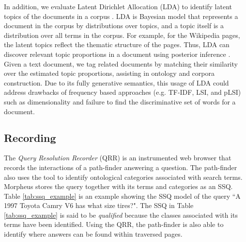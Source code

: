 In addition, we evaluate Latent Dirichlet Allocation (LDA) to identify latent topics of the documents in a corpus \cite{Blei2003latentdirichlet}.  LDA is Bayesian model that represents a document in the corpus by distributions over topics, and a topic itself is a distribution over all  terms in the corpus.  For example, for the Wikipedia pages, the latent topics reflect the thematic structure of the pages. Thus, LDA can discover relevant topic proportions in a document using posterior inference \cite{Blei2003latentdirichlet}. Given a text document, we tag related documents by matching their similarity over the estimated topic proportions, assisting in ontology and corpora construction.  Due to its fully generative semantics, this usage of LDA could address drawbacks of frequency based approaches (e.g. TF-IDF, LSI, and pLSI) such as dimensionality and failure to find the discriminative set of words for a document. %


\subsection{ Recording}
\label{sec:query_processing}


The \emph{Query Resolution Recorder} (QRR) is an instrumented web browser that records the interactions of a path-finder answering a question. The path-finder also uses the tool to identify ontological categories associated with search terms. Morpheus stores the query together with its terms and categories as an SSQ.  Table \ref{tab:ssq_example} is an example showing the SSQ model of the query ``A 1997 Toyota Camry V6 has what size tires?". The SSQ in Table \ref{tab:ssq_example} is said to be \emph{qualified} because the classes associated with its terms have been identified. Using the QRR, the path-finder is also able to identify where answers can be found within traversed pages.





